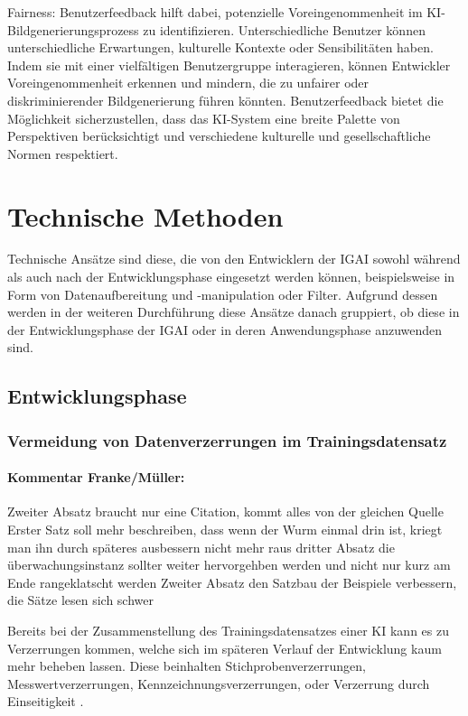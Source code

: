 \documentclass[12pt]{article}
\begin{document}
Fairness: Benutzerfeedback hilft dabei, potenzielle Voreingenommenheit im KI-Bildgenerierungsprozess zu identifizieren. Unterschiedliche Benutzer können unterschiedliche Erwartungen, kulturelle Kontexte oder Sensibilitäten haben. Indem sie mit einer vielfältigen Benutzergruppe interagieren, können Entwickler Voreingenommenheit erkennen und mindern, die zu unfairer oder diskriminierender Bildgenerierung führen könnten. Benutzerfeedback bietet die Möglichkeit sicherzustellen, dass das KI-System eine breite Palette von Perspektiven berücksichtigt und verschiedene kulturelle und gesellschaftliche Normen respektiert.

\section{Technische Methoden}

Technische Ansätze sind diese, die von den Entwicklern der IGAI sowohl während als auch nach der Entwicklungsphase eingesetzt werden können, beispielsweise in Form von Datenaufbereitung und -manipulation oder Filter. 
Aufgrund dessen werden in der weiteren Durchführung diese Ansätze danach gruppiert, ob diese in der Entwicklungsphase der IGAI oder in deren Anwendungsphase anzuwenden sind.

\subsection{Entwicklungsphase}
\subsubsection{Vermeidung von Datenverzerrungen im Trainingsdatensatz}


\paragraph{Kommentar Franke/Müller:}
Zweiter Absatz braucht nur eine Citation, kommt alles von der gleichen Quelle
Erster Satz soll mehr beschreiben, dass wenn der Wurm einmal drin ist, kriegt man ihn durch späteres ausbessern nicht mehr raus
dritter Absatz die überwachungsinstanz sollter weiter hervorgehben werden und nicht nur kurz am Ende rangeklatscht werden
Zweiter Absatz den Satzbau der Beispiele verbessern, die Sätze lesen sich schwer


Bereits bei der Zusammenstellung des Trainingsdatensatzes einer KI kann es zu Verzerrungen kommen, welche sich im späteren Verlauf der Entwicklung kaum mehr beheben lassen.
Diese beinhalten Stichprobenverzerrungen, Messwertverzerrungen, Kennzeichnungsverzerrungen, oder Verzerrung durch Einseitigkeit \cite{Srinivasan}.
\end{document}

